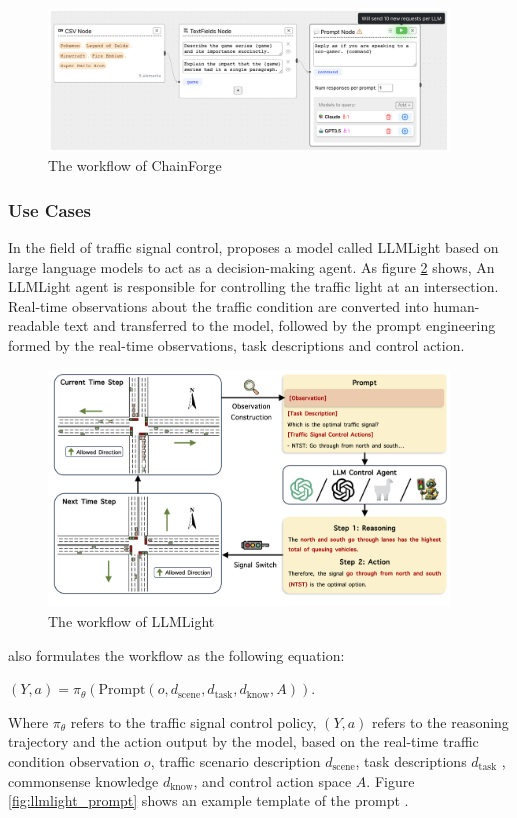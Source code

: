 \documentclass[runningheads]{llncs}
\begin{document}
\begin{figure}[H]
  \centering
  \includegraphics[width=0.95\textwidth]{chainforge.png}
  \caption{The workflow of ChainForge \cite{Arawjo24}}
  \label{fig:chainforge}
\end{figure}

\subsubsection{Use Cases}
\noindent \newline
In the field of traffic signal control, \cite{Lai23} proposes a model called LLMLight based on large language models to act as a decision-making agent. As figure \ref{fig:llmlight} shows,
An LLMLight agent is responsible for controlling the traffic light at an intersection. Real-time observations about the traffic condition are converted into human-readable text and transferred to 
the model, followed by the prompt engineering formed by the real-time observations, task descriptions and control action.
\begin{figure}[H]
  \centering
  \includegraphics[width=0.95\textwidth]{LLMLight.PNG}
  \caption{The workflow of LLMLight \cite{Lai23}}
  \label{fig:llmlight}
\end{figure}
\noindent
\cite{Lai23} also formulates the workflow as the following equation:
\begin{definition}
  $(Y, a) = \pi_{\theta}(\text{Prompt}(o, d_{\text{scene}}, d_{\text{task}}, d_{\text{know}}, A))$.
\end{definition}
Where $\pi_{\theta}$ refers to the traffic signal control policy, $(Y, a)$ refers to the reasoning trajectory and the action output by the model,
based on the real-time traffic condition observation $o$, traffic scenario description $d_{\text{scene}}$, task descriptions $d_{\text{task}}$ , commonsense knowledge $d_{\text{know}}$, and control action space $A$.
Figure \ref{fig:llmlight_prompt} shows an example template of the prompt \cite{Lai23}.
\end{document}
